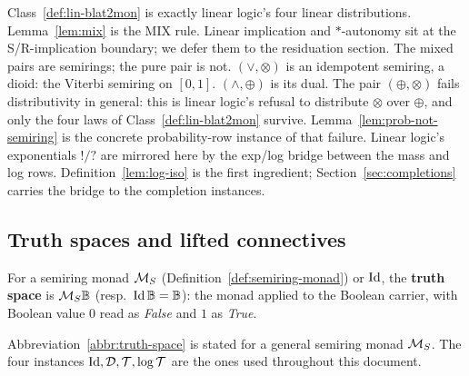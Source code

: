 Class~\ref{def:lin-blat2mon} is exactly linear logic's four linear
distributions. Lemma~\ref{lem:mix} is the MIX rule. Linear implication
and $*$-autonomy sit at the S/R-implication boundary; we defer them to
the residuation section. The mixed pairs are semirings; the pure pair
is not. $(\vee, \otimes)$ is an idempotent semiring, a dioid: the
Viterbi semiring on $[0,1]$. $(\wedge, \oplus)$ is its dual. The pair
$(\oplus, \otimes)$ fails distributivity in general: this is linear
logic's refusal to distribute $\otimes$ over $\oplus$, and only the
four laws of Class~\ref{def:lin-blat2mon} survive. Lemma~\ref{lem:prob-not-semiring}
is the concrete probability-row instance of that failure. Linear
logic's exponentials $!/?$ are mirrored here by the exp/log bridge
between the mass and log rows. Definition~\ref{lem:log-iso} is the
first ingredient; Section~\ref{sec:completions} carries the bridge to
the completion instances.

\subsection{Truth spaces and lifted connectives}  %
\label{sec:truth-spaces}


\begin{abbreviation}
\label{abbr:truth-space}
\leanok
For a semiring monad $\mathcal M_{S}$ (Definition~\ref{def:semiring-monad}) or
$\mathrm{Id}$, the \textbf{truth space} is $\mathcal M_{S}\mathbb B$ (resp.\
$\mathrm{Id}\,\mathbb B = \mathbb B$): the monad applied to the Boolean carrier,
with Boolean value $0$ read as \emph{False} and $1$ as \emph{True}.
\uses{def:semiring-monad}
\end{abbreviation}

Abbreviation~\ref{abbr:truth-space} is stated for a general semiring
monad $\mathcal M_{S}$. The four instances $\mathrm{Id}, \mathcal D, \mathcal T, \log\mathcal T$ are
the ones used throughout this document.

